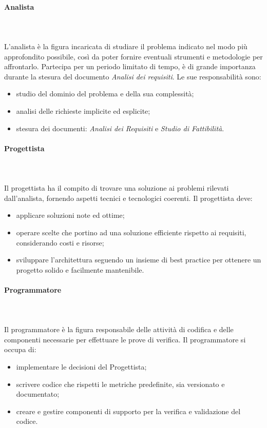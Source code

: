 			\paragraph{Analista} \mbox{}\\ \mbox{}\\
			L'analista è la figura incaricata di studiare il problema indicato nel modo più approfondito possibile, così da poter fornire eventuali strumenti e metodologie per affrontarlo. 
			Partecipa per un periodo limitato di tempo, è di grande importanza durante la stesura del documento \textit{Analisi dei requisiti}.\newline
			Le sue responsabilità sono:
			\begin{itemize}
				\item studio del dominio del problema e della sua complessità;
				\item analisi delle richieste implicite ed esplicite;
				\item stesura dei documenti: \textit{Analisi dei Requisiti} e \textit{Studio di Fattibilità}.
			\end{itemize}
			\paragraph{Progettista} \mbox{}\\ \mbox{}\\
			Il progettista ha il compito di trovare una soluzione ai problemi rilevati dall'analista, fornendo aspetti tecnici e tecnologici coerenti.\newline
			Il progettista deve:
			\begin{itemize}
				\item applicare soluzioni note ed ottime;
				\item operare scelte che portino ad una soluzione efficiente rispetto ai requisiti, considerando costi e risorse;
				\item sviluppare l'architettura seguendo un insieme di best practice per ottenere un progetto solido e facilmente mantenibile.
			\end{itemize}
			\paragraph{Programmatore} \mbox{}\\ \mbox{}\\
			Il programmatore è la figura responsabile delle attività di codifica e delle componenti necessarie per effettuare le prove di verifica.
			Il programmatore si occupa di:
			\begin{itemize}
				\item implementare le decisioni del Progettista;
				\item scrivere codice che rispetti le metriche predefinite, sia versionato e documentato;
				\item creare e gestire componenti di supporto per la verifica e validazione del codice.
			\end{itemize}
